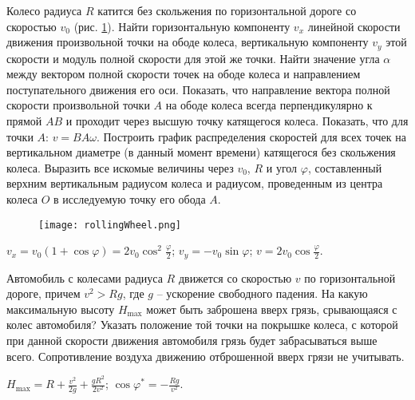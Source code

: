 \begin{ex} %
Колесо радиуса $R$ катится без скольжения по горизонтальной дороге со скоростью $v_0$ (рис. \ref{rollingWheel}). Найти горизонтальную компоненту $v_x$ линейной скорости движения произвольной точки на ободе колеса, вертикальную компоненту $v_y$ этой скорости и модуль полной скорости для этой же точки. Найти значение угла $\alpha$ между вектором полной скорости точек на ободе колеса и направлением поступательного движения его оси. Показать, что направление вектора полной скорости произвольной точки $A$ на ободе колеса всегда перпендикулярно к прямой $AB$ и проходит через высшую точку катящегося колеса. Показать, что для точки $A$: $v = BA \omega$. Построить график распределения скоростей для всех точек на вертикальном диаметре (в данный момент времени) катящегося без скольжения колеса. Выразить все искомые величины через $v_0$, $R$ и угол $\varphi$, составленный верхним вертикальным радиусом колеса и радиусом, проведенным из центра колеса $O$ в исследуемую точку его обода $A$.

\begin{figure}[h]
\centering
\texttt{[image: rollingWheel.png]}
\caption{}
\label{rollingWheel}
\end{figure}

\begin{ans}
$v_x = v_0 (1 + \cos \varphi) = 2v_0 \cos^2 \frac{\varphi}{2}$; $v_y = -v_0 \sin \varphi$; $v = 2v_0 \cos \frac{\varphi}{2}$.
\end{ans}
\end{ex}

\begin{ex} %
Автомобиль с колесами радиуса $R$ движется со скоростью $v$ по горизонтальной дороге, причем $v^2 > Rg$, где $g$ -- ускорение свободного падения. На какую максимальную высоту $H_{\max}$ может быть заброшена вверх грязь, срывающаяся с колес автомобиля? Указать положение той точки на покрышке колеса, с которой при данной скорости движения автомобиля грязь будет забрасываться выше всего. Сопротивление воздуха движению отброшенной вверх грязи не учитывать.
\begin{ans}
$H_{\max} = R + \frac{v^2}{2g} + \frac{gR^2}{2v^2}$; $\cos \varphi^{*} = - \frac{Rg}{v^2}$.
\end{ans}
\end{ex}

